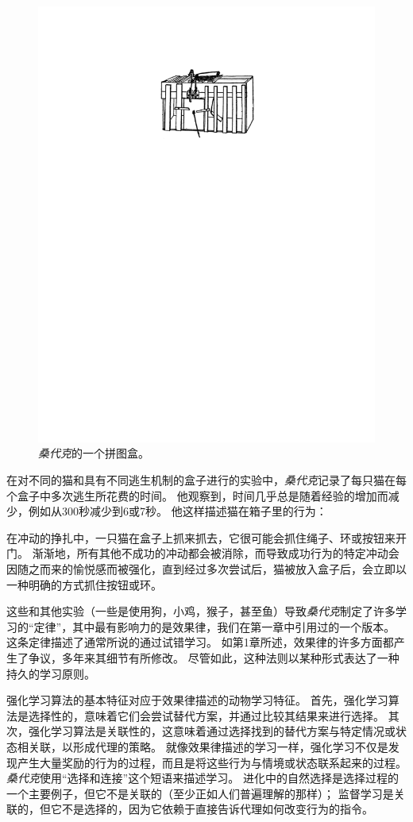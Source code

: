 \begin{figure}[!htb]
	\centering
	\includegraphics[width=0.5\linewidth]{chap11/fig_11_7}
	\caption{\textit{桑代克}的一个拼图盒\cite{thorndike1898animal}。  \label{fig:11_7}}
\end{figure}

在对不同的猫和具有不同逃生机制的盒子进行的实验中，\textit{桑代克}记录了每只猫在每个盒子中多次逃生所花费的时间。
他观察到，时间几乎总是随着经验的增加而减少，例如从300秒减少到6或7秒。
他这样描述猫在箱子里的行为：


在冲动的挣扎中，一只猫在盒子上抓来抓去，它很可能会抓住绳子、环或按钮来开门。
渐渐地，所有其他不成功的冲动都会被消除，而导致成功行为的特定冲动会因随之而来的愉悦感而被强化，直到经过多次尝试后，猫被放入盒子后，会立即以一种明确的方式抓住按钮或环\cite{thorndike1898animal}。


这些和其他实验（一些是使用狗，小鸡，猴子，甚至鱼）导致\textit{桑代克}制定了许多学习的“定律”，其中最有影响力的是效果律，我们在第一章中引用过的一个版本。
这条定律描述了通常所说的通过试错学习。
如第1章所述，效果律的许多方面都产生了争议，多年来其细节有所修改。
尽管如此，这种法则以某种形式表达了一种持久的学习原则。


强化学习算法的基本特征对应于效果律描述的动物学习特征。
首先，强化学习算法是选择性的，意味着它们会尝试替代方案，并通过比较其结果来进行选择。
其次，强化学习算法是关联性的，这意味着通过选择找到的替代方案与特定情况或状态相关联，以形成代理的策略。
就像效果律描述的学习一样，强化学习不仅是发现产生大量奖励的行为的过程，而且是将这些行为与情境或状态联系起来的过程。
\textit{桑代克}使用“选择和连接”这个短语来描述学习。
进化中的自然选择是选择过程的一个主要例子，但它不是关联的（至少正如人们普遍理解的那样）；
监督学习是关联的，但它不是选择的，因为它依赖于直接告诉代理如何改变行为的指令。


